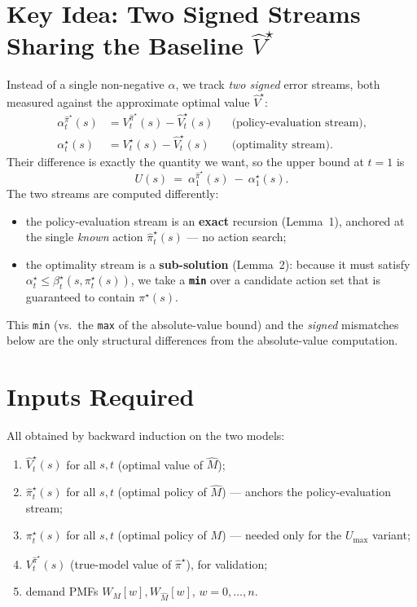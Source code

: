 \documentclass[11pt]{article}
\newcommand{\Vhat}{\hat V}
\newcommand{\pihat}{\hat\pi}
\begin{document}
\section{Key Idea: Two Signed Streams Sharing the Baseline $\Vhat^\star$}
Instead of a single non-negative $\alpha$, we track \emph{two signed} error
streams, both measured against the approximate optimal value $\Vhat^\star$:
\begin{align}
\alpha^{\pihat^\star}_t(s) &= V^{\pihat^\star}_t(s)-\Vhat^\star_t(s)
&&\text{(policy-evaluation stream),}\\
\alpha^{\star}_t(s) &= V^{\star}_t(s)-\Vhat^\star_t(s)
&&\text{(optimality stream).}
\end{align}
Their difference is exactly the quantity we want, so the upper bound at $t=1$ is
\begin{equation}
U(s)\ =\ \alpha^{\pihat^\star}_1(s)\ -\ \alpha^{\star}_1(s).
\label{eq:U}
\end{equation}
The two streams are computed differently:
\begin{itemize}
\item the policy-evaluation stream is an \textbf{exact} recursion (Lemma~1),
anchored at the single \emph{known} action $\pihat^\star_t(s)$ --- no action
search;
\item the optimality stream is a \textbf{sub-solution} (Lemma~2): because it must
satisfy $\alpha^\star_t\le\beta^\star_t(s,\pi^\star_t(s))$, we take a
\textbf{\texttt{min}} over a candidate action set that is guaranteed to contain
$\pi^\star(s)$.
\end{itemize}
This \texttt{min} (vs.\ the \texttt{max} of the absolute-value bound) and the
\emph{signed} mismatches below are the only structural differences from the
absolute-value computation.

\section{Inputs Required}
All obtained by backward induction on the two models:
\begin{enumerate}
\item $\Vhat^\star_t(s)$ for all $s,t$ (optimal value of $\hat M$);
\item $\pihat^\star_t(s)$ for all $s,t$ (optimal policy of $\hat M$) --- anchors the
policy-evaluation stream;
\item $\pi^\star_t(s)$ for all $s,t$ (optimal policy of $M$) --- needed only for the
$U_{\max}$ variant;
\item $V^{\pihat^\star}_t(s)$ (true-model value of $\pihat^\star$), for validation;
\item demand PMFs $W_M[w],W_{\hat M}[w]$, $w=0,\dots,n$.
\end{enumerate}
\end{document}

